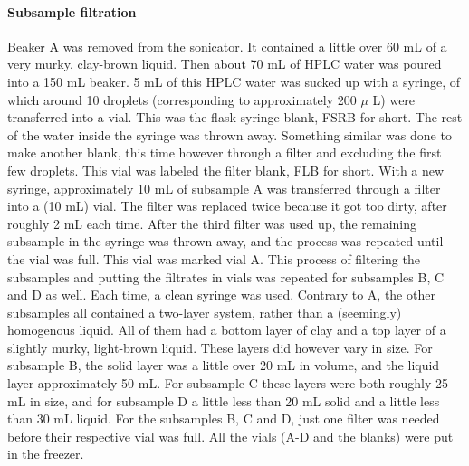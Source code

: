\documentclass[twocolumn,a4paper,aps,amsmath,amssymb,floatfix,superscriptaddress]{revtex4-2}
\begin{document}
	\paragraph*{Subsample filtration}
	Beaker A was removed from the sonicator. It contained a little over 60 mL of a very murky, clay-brown liquid. 
	Then about 70 mL of HPLC water was poured into a 150 mL beaker. 5 mL of this HPLC water was sucked up with a syringe, of which around 10 droplets (corresponding to approximately 200 $\mu$ L) were transferred into a vial. This was the flask syringe blank, FSRB for short. The rest of the water inside the syringe was thrown away. Something similar was done to make another blank, this time however through a filter and excluding the first few droplets. This vial was labeled the filter blank, FLB for short.
	With a new syringe, approximately 10 mL of subsample A was transferred through a filter into a (10 mL) vial. The filter was replaced twice because it got too dirty, after roughly 2 mL each time. After the third filter was used up, the remaining subsample in the syringe was thrown away, and the process was repeated until the vial was full. This vial was marked vial A. 
	This process of filtering the subsamples and putting the filtrates in vials was repeated for subsamples B, C and D as well. Each time, a clean syringe was used. Contrary to A, the other subsamples all contained a two-layer system, rather than a (seemingly) homogenous liquid. All of them had a bottom layer of clay and a top layer of a slightly murky, light-brown liquid. These layers did however vary in size. For subsample B, the solid layer was a little over 20 mL in volume, and the liquid layer approximately 50 mL. For subsample C these layers were both roughly 25 mL in size, and for subsample D a little less than 20 mL solid and a little less than 30 mL liquid. For the subsamples B, C and D, just one filter was needed before their respective vial was full.
	All the vials (A-D and the blanks) were put in the freezer.
\end{document}
